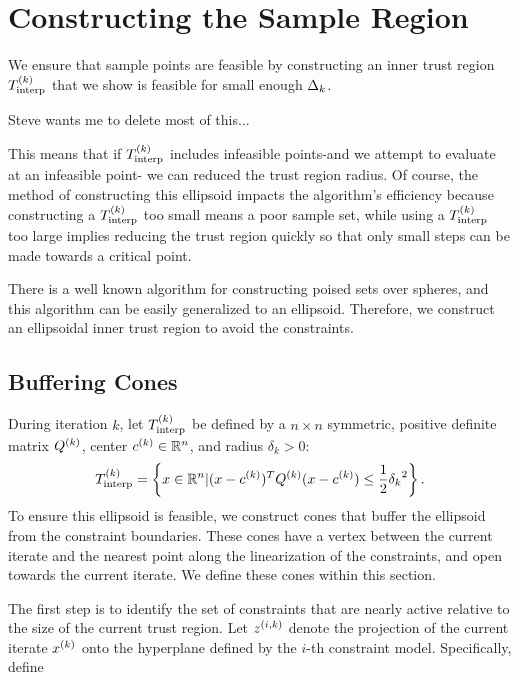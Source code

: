 \section{Constructing the Sample Region}
\label{possible_ellipsoids}

We ensure that sample points are feasible by constructing an inner trust region ${T_{\text{interp}}^{(k)}}$ that we show is feasible for small enough $\Delta_k$.
\begin{boxedcomment}
Steve wants me to delete most of this...
\end{boxedcomment}
This means that if ${T_{\text{interp}}^{(k)}}$ includes infeasible points-and we attempt to evaluate at an infeasible point- we can reduced the trust region radius.
Of course, the method of constructing this ellipsoid impacts the algorithm's efficiency because constructing a ${T_{\text{interp}}^{(k)}}$ too small means a poor sample set,
while using a ${T_{\text{interp}}^{(k)}}$ too large implies reducing the trust region quickly so that only small steps can be made towards a critical point.

There is a well known algorithm for constructing poised sets over spheres, and this algorithm can be easily generalized to an ellipsoid.
Therefore, we construct an ellipsoidal inner trust region to avoid the constraints.


\subsection{Buffering Cones}
\label{ellipsoid_requirements}
During iteration $k$, let ${T_{\text{interp}}^{(k)}}$ be defined by a $n\times n$ symmetric, positive definite matrix ${Q^{(k)}}$, center ${c^{(k)}} \in \mathbb R^n$, and radius $\delta_{k} > 0$:
\begin{align}
{T_{\text{interp}}^{(k)}} = \left \{x \in \mathbb R^n | (x - {c^{(k)}})^T {Q^{(k)}}(x - {c^{(k)}}) \le \frac 1 2 {\delta_k}^2 \right \}. \label{define_sampletrk}
\end{align}
To ensure this ellipsoid is feasible, we construct cones that buffer the ellipsoid from the constraint boundaries.
These cones have a vertex between the current iterate and the nearest point along the linearization of the constraints, and open towards the current iterate.
We define these cones within this section.

The first step is to identify the set of constraints that are nearly active relative to the size of the current trust region.
Let ${z^{(i, k)}}$ denote the projection of the current iterate $x^{(k)}$ onto the hyperplane defined by the $i$-th constraint model.
Specifically, define


